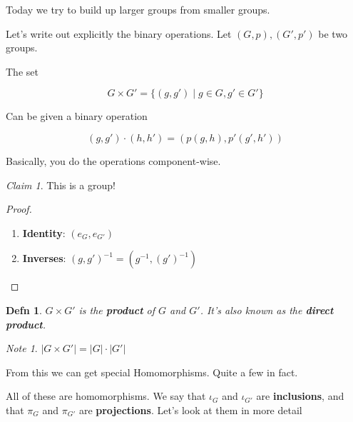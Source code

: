 \documentclass[12pt]{article}
\newtheorem{definition}{Defn}
\theoremstyle{remark}
\theoremstyle{remark}
\newtheorem{claim}{Claim}
\theoremstyle{remark}
\theoremstyle{remark}
\theoremstyle{remark}
\newtheorem*{note}{Note}
\begin{document}
Today we try to build up larger groups from smaller groups.

Let's write out explicitly the binary operations. Let $(G, p), (G', p')$ be two
groups.

The set

\[
  G \times G' = \{(g, g') \mid g \in G, g' \in G' \}
\]

Can be given a binary operation

\[
  (g, g') \cdot (h, h') = (p(g, h), p'(g', h'))
\]

Basically, you do the operations component-wise.

\begin{claim}
  This is a group!
\end{claim}

\begin{proof}
  \begin{enumerate}
    \item {\bf Identity}: $(e_G, e_{G'})$
    \item {\bf Inverses}: $(g, g')^{-1} = (g^{-1}, (g')^{-1})$
  \end{enumerate}
\end{proof}

\begin{definition}
  $G \times G'$ is the {\bf product} of $G$ and $G'$. It's also known as the
  {\bf direct product}.
\end{definition}

\begin{note}
  $|G \times G'| = |G| \cdot |G'|$
\end{note}

From this we can get special Homomorphisms. Quite a few in fact.

\begin{center}
\end{center}

All of these are homomorphisms. We say that $\iota_G$ and $\iota_{G'}$ are {\bf
inclusions}, and that $\pi_G$ and $\pi_{G'}$ are {\bf projections}. Let's look
at them in more detail
\end{document}
